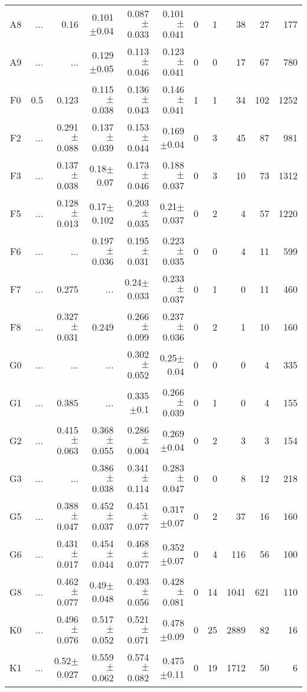 \begin{table}[t]
\begin{table}[t]
\begin{center}
\begin{tabular}{c|rrrrr|rrrrr}
    A8	&	 ...	&	0.16	&	0.101$\pm$0.04	&	0.087$\pm$0.033	&	0.101$\pm$0.041	&	0	&	1	&	38	&	27	&	177	\\
    A9	&	 ...	&	 ...	&	0.129$\pm$0.05	&	0.113$\pm$0.046	&	0.123$\pm$0.041	&	0	&	0	&	17	&	67	&	780	\\
    F0	&	0.5	&	0.123	&	0.115$\pm$0.038	&	0.136$\pm$0.043	&	0.146$\pm$0.041	&	1	&	1	&	34	&	102	&	1252	\\
    F2	&	 ...	&	0.291$\pm$0.088	&	0.137$\pm$0.039	&	0.153$\pm$0.044	&	0.169$\pm$0.04	&	0	&	3	&	45	&	87	&	981	\\
    F3	&	 ...	&	0.137$\pm$0.038	&	0.18$\pm$0.07	&	0.173$\pm$0.046	&	0.188$\pm$0.037	&	0	&	3	&	10	&	73	&	1312	\\
    F5	&	 ...	&	0.128$\pm$0.013	&	0.17$\pm$0.102	&	0.203$\pm$0.035	&	0.21$\pm$0.037	&	0	&	2	&	4	&	57	&	1220	\\
    F6	&	 ...	&	 ...	&	0.197$\pm$0.036	&	0.195$\pm$0.031	&	0.223$\pm$0.035	&	0	&	0	&	4	&	11	&	599	\\
    F7	&	 ...	&	0.275	&	 ...	&	0.24$\pm$0.033	&	0.233$\pm$0.037	&	0	&	1	&	0	&	11	&	460	\\
    F8	&	 ...	&	0.327$\pm$0.031	&	0.249	&	0.266$\pm$0.099	&	0.237$\pm$0.036	&	0	&	2	&	1	&	10	&	160	\\
    G0	&	 ...	&	 ...	&	 ...	&	0.302$\pm$0.052	&	0.25$\pm$0.04	&	0	&	0	&	0	&	4	&	335	\\
    G1	&	 ...	&	0.385	&	 ...	&	0.335$\pm$0.1	&	0.266$\pm$0.039	&	0	&	1	&	0	&	4	&	155	\\
    G2	&	 ...	&	0.415$\pm$0.063	&	0.368$\pm$0.055	&	0.286$\pm$0.004	&	0.269$\pm$0.04	&	0	&	2	&	3	&	3	&	154	\\
    G3	&	 ...	&	 ...	&	0.386$\pm$0.038	&	0.341$\pm$0.114	&	0.283$\pm$0.047	&	0	&	0	&	8	&	12	&	218	\\
    G5	&	 ...	&	0.388$\pm$0.047	&	0.452$\pm$0.037	&	0.451$\pm$0.077	&	0.317$\pm$0.07	&	0	&	2	&	37	&	16	&	160	\\
    G6	&	 ...	&	0.431$\pm$0.017	&	0.454$\pm$0.044	&	0.468$\pm$0.077	&	0.352$\pm$0.07	&	0	&	4	&	116	&	56	&	100	\\
    G8	&	 ...	&	0.462$\pm$0.077	&	0.49$\pm$0.048	&	0.493$\pm$0.056	&	0.428$\pm$0.081	&	0	&	14	&	1041	&	621	&	110	\\
    K0	&	 ...	&	0.496$\pm$0.076	&	0.517$\pm$0.052	&	0.521$\pm$0.071	&	0.478$\pm$0.09	&	0	&	25	&	2889	&	82	&	16	\\
    K1	&	 ...	&	0.52$\pm$0.027	&	0.559$\pm$0.062	&	0.574$\pm$0.082	&	0.475$\pm$0.11	&	0	&	19	&	1712	&	50	&	6	\\

\end{tabular}
\end{center}
\end{table}
\end{table}
